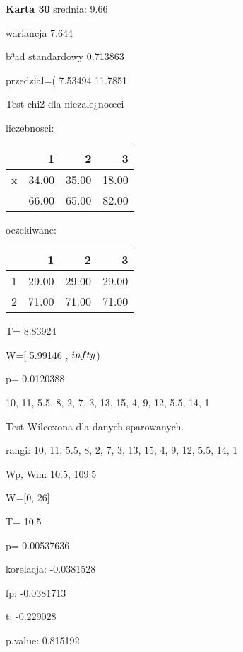 \documentclass[a4paper,12pt]{article}
\begin{document}
\begin{multicols}{3}
  \textbf{Karta  30 } 
 srednia: 9.66 
     
     wariancja 7.644  
     
     b³ad standardowy 0.713863 
     
     przedzial=( 7.53494 11.7851 \vspace{1cm} 

  Test chi2 dla niezale¿noœci 
   
   liczebnosci: %
\begin{tabular}{rrrr}
  \hline
 & 1 & 2 & 3 \\
  \hline
x & 34.00 & 35.00 & 18.00 \\
   & 66.00 & 65.00 & 82.00 \\
   \hline
\end{tabular}
 
   
   oczekiwane: %
\begin{tabular}{rrrr}
  \hline
 & 1 & 2 & 3 \\
  \hline
1 & 29.00 & 29.00 & 29.00 \\
  2 & 71.00 & 71.00 & 71.00 \\
   \hline
\end{tabular}
 
   
   T= 8.83924 
   
   W=[ 5.99146 , $\\infty$) 
   
   p= 0.0120388 \vspace{1cm} 

  10, 11, 5.5, 8, 2, 7, 3, 13, 15, 4, 9, 12, 5.5, 14, 1 

  Test Wilcoxona dla danych sparowanych. 
  
  rangi: 10, 11, 5.5, 8, 2, 7, 3, 13, 15, 4, 9, 12, 5.5, 14, 1 
  
  Wp, Wm:  10.5,  109.5 
  
  W=[0, 26]  
  
  T=  10.5 
  
  p= 0.00537636 \vspace{1cm} 

  korelacja: -0.0381528
     
     fp: -0.0381713
     
     t: -0.229028
     
     p.value: 0.815192 \vspace{1cm} \end{multicols}  
\end{document}
